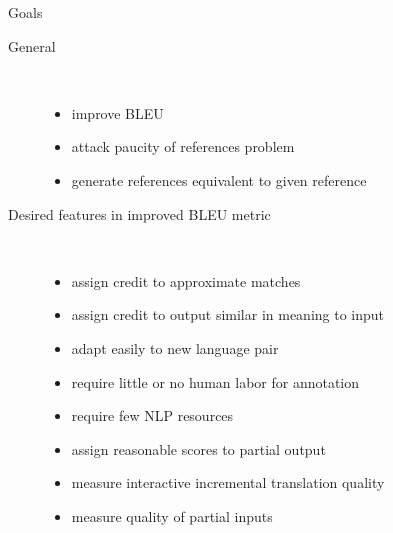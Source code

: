 \begin{block}{Goals}
\begin{description}
\item[General] \hfill \\
\begin{itemize}
\item 
improve BLEU
\item 
attack  paucity of references problem
\item 
generate references equivalent to   given reference
\end{itemize}
\item[Desired features  in  improved BLEU metric] \hfill \\
\begin{itemize}
\item 
assign credit to approximate matches
\item 
assign credit to output   similar in meaning to  input 
\item 
adapt easily to  new language pair
\item 
require little or no human labor for annotation
\item  
require few NLP resources 
\item 
assign reasonable scores to partial output
\item 
measure interactive incremental translation quality
\item 
measure  quality of partial inputs 
\end{itemize}
\end{description}
\end{block}


